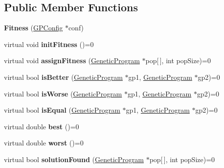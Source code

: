 \subsection*{Public Member Functions}
\begin{DoxyCompactItemize}
\item 
\hypertarget{classFitness_ae7a108ef7b21c86d21edc1d65fb94791}{}\label{classFitness_ae7a108ef7b21c86d21edc1d65fb94791} 
{\bfseries Fitness} (\hyperlink{classGPConfig}{G\+P\+Config} $\ast$conf)
\item 
\hypertarget{classFitness_af0cc76842533549497d736317291adeb}{}\label{classFitness_af0cc76842533549497d736317291adeb} 
virtual void {\bfseries init\+Fitness} ()=0
\item 
\hypertarget{classFitness_ad0204160e312a1949c92dbe97dc45283}{}\label{classFitness_ad0204160e312a1949c92dbe97dc45283} 
virtual void {\bfseries assign\+Fitness} (\hyperlink{classGeneticProgram}{Genetic\+Program} $\ast$pop\mbox{[}$\,$\mbox{]}, int pop\+Size)=0
\item 
\hypertarget{classFitness_ad0121622fdd110ac1da209c000ec0efa}{}\label{classFitness_ad0121622fdd110ac1da209c000ec0efa} 
virtual bool {\bfseries is\+Better} (\hyperlink{classGeneticProgram}{Genetic\+Program} $\ast$gp1, \hyperlink{classGeneticProgram}{Genetic\+Program} $\ast$gp2)=0
\item 
\hypertarget{classFitness_a0faa716e3afd9de0580ed7526b7eeed3}{}\label{classFitness_a0faa716e3afd9de0580ed7526b7eeed3} 
virtual bool {\bfseries is\+Worse} (\hyperlink{classGeneticProgram}{Genetic\+Program} $\ast$gp1, \hyperlink{classGeneticProgram}{Genetic\+Program} $\ast$gp2)=0
\item 
\hypertarget{classFitness_acd0b1070998ce9c8f1522f0107cc81e8}{}\label{classFitness_acd0b1070998ce9c8f1522f0107cc81e8} 
virtual bool {\bfseries is\+Equal} (\hyperlink{classGeneticProgram}{Genetic\+Program} $\ast$gp1, \hyperlink{classGeneticProgram}{Genetic\+Program} $\ast$gp2)=0
\item 
\hypertarget{classFitness_a6d16f5fa00718ec77703a16cdde52bba}{}\label{classFitness_a6d16f5fa00718ec77703a16cdde52bba} 
virtual double {\bfseries best} ()=0
\item 
\hypertarget{classFitness_a826f973a29bf98da811315b77c4c3710}{}\label{classFitness_a826f973a29bf98da811315b77c4c3710} 
virtual double {\bfseries worst} ()=0
\item 
\hypertarget{classFitness_a580a796f63acf4afdcb9061c484692c0}{}\label{classFitness_a580a796f63acf4afdcb9061c484692c0} 
virtual bool {\bfseries solution\+Found} (\hyperlink{classGeneticProgram}{Genetic\+Program} $\ast$pop\mbox{[}$\,$\mbox{]}, int pop\+Size)=0
\end{DoxyCompactItemize}
